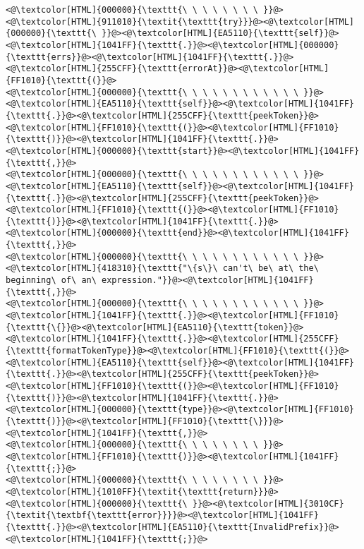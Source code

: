 \begin{lstlisting}
<@\textcolor[HTML]{000000}{\texttt{\ \ \ \ \ \ \ \ }}@><@\textcolor[HTML]{911010}{\textit{\texttt{try}}}@><@\textcolor[HTML]{000000}{\texttt{\ }}@><@\textcolor[HTML]{EA5110}{\texttt{self}}@><@\textcolor[HTML]{1041FF}{\texttt{.}}@><@\textcolor[HTML]{000000}{\texttt{errs}}@><@\textcolor[HTML]{1041FF}{\texttt{.}}@><@\textcolor[HTML]{255CFF}{\texttt{errorAt}}@><@\textcolor[HTML]{FF1010}{\texttt{(}}@>
<@\textcolor[HTML]{000000}{\texttt{\ \ \ \ \ \ \ \ \ \ \ \ }}@><@\textcolor[HTML]{EA5110}{\texttt{self}}@><@\textcolor[HTML]{1041FF}{\texttt{.}}@><@\textcolor[HTML]{255CFF}{\texttt{peekToken}}@><@\textcolor[HTML]{FF1010}{\texttt{(}}@><@\textcolor[HTML]{FF1010}{\texttt{)}}@><@\textcolor[HTML]{1041FF}{\texttt{.}}@><@\textcolor[HTML]{000000}{\texttt{start}}@><@\textcolor[HTML]{1041FF}{\texttt{,}}@>
<@\textcolor[HTML]{000000}{\texttt{\ \ \ \ \ \ \ \ \ \ \ \ }}@><@\textcolor[HTML]{EA5110}{\texttt{self}}@><@\textcolor[HTML]{1041FF}{\texttt{.}}@><@\textcolor[HTML]{255CFF}{\texttt{peekToken}}@><@\textcolor[HTML]{FF1010}{\texttt{(}}@><@\textcolor[HTML]{FF1010}{\texttt{)}}@><@\textcolor[HTML]{1041FF}{\texttt{.}}@><@\textcolor[HTML]{000000}{\texttt{end}}@><@\textcolor[HTML]{1041FF}{\texttt{,}}@>
<@\textcolor[HTML]{000000}{\texttt{\ \ \ \ \ \ \ \ \ \ \ \ }}@><@\textcolor[HTML]{418310}{\texttt{"\{s\}\ can't\ be\ at\ the\ beginning\ of\ an\ expression."}}@><@\textcolor[HTML]{1041FF}{\texttt{,}}@>
<@\textcolor[HTML]{000000}{\texttt{\ \ \ \ \ \ \ \ \ \ \ \ }}@><@\textcolor[HTML]{1041FF}{\texttt{.}}@><@\textcolor[HTML]{FF1010}{\texttt{\{}}@><@\textcolor[HTML]{EA5110}{\texttt{token}}@><@\textcolor[HTML]{1041FF}{\texttt{.}}@><@\textcolor[HTML]{255CFF}{\texttt{formatTokenType}}@><@\textcolor[HTML]{FF1010}{\texttt{(}}@><@\textcolor[HTML]{EA5110}{\texttt{self}}@><@\textcolor[HTML]{1041FF}{\texttt{.}}@><@\textcolor[HTML]{255CFF}{\texttt{peekToken}}@><@\textcolor[HTML]{FF1010}{\texttt{(}}@><@\textcolor[HTML]{FF1010}{\texttt{)}}@><@\textcolor[HTML]{1041FF}{\texttt{.}}@><@\textcolor[HTML]{000000}{\texttt{type}}@><@\textcolor[HTML]{FF1010}{\texttt{)}}@><@\textcolor[HTML]{FF1010}{\texttt{\}}}@><@\textcolor[HTML]{1041FF}{\texttt{,}}@>
<@\textcolor[HTML]{000000}{\texttt{\ \ \ \ \ \ \ \ }}@><@\textcolor[HTML]{FF1010}{\texttt{)}}@><@\textcolor[HTML]{1041FF}{\texttt{;}}@>
<@\textcolor[HTML]{000000}{\texttt{\ \ \ \ \ \ \ \ }}@><@\textcolor[HTML]{1010FF}{\textit{\texttt{return}}}@><@\textcolor[HTML]{000000}{\texttt{\ }}@><@\textcolor[HTML]{3010CF}{\textit{\textbf{\texttt{error}}}}@><@\textcolor[HTML]{1041FF}{\texttt{.}}@><@\textcolor[HTML]{EA5110}{\texttt{InvalidPrefix}}@><@\textcolor[HTML]{1041FF}{\texttt{;}}@>

\end{lstlisting}

